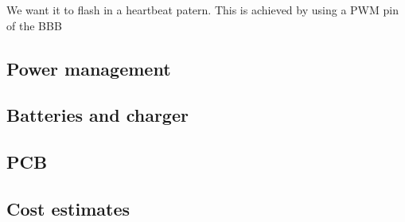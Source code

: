 We want it to flash in a heartbeat patern. This is achieved by using a PWM pin of the BBB
\subsection{Power management}
\subsection{Batteries and charger}
\subsection{PCB}
\subsection{Cost estimates}
